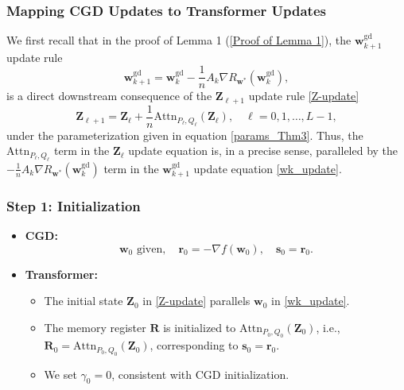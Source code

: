 \documentclass[11pt]{article}
\theoremstyle{plain}
\theoremstyle{definition}
\theoremstyle{remark}
\numberwithin{equation}{section}
\begin{document}
\FloatBarrier

\subsubsection*{Mapping CGD Updates to Transformer Updates}

We first recall that in the proof of Lemma 1 (\ref{Proof of Lemma 1}), the \(\mathbf{w}_{k+1}^{\text{gd}}\) update rule
\begin{equation}
\mathbf{w}_{k+1}^{\text{gd}} = \mathbf{w}_k^{\text{gd}} - \frac{1}{n} A_k \nabla R_{\mathbf{w}^*}(\mathbf{w}_k^{\text{gd}}), \label{wk_update}
\end{equation}
is a direct downstream consequence of the \(\mathbf{Z}_{\ell+1}\) update rule \eqref{Z-update}
\[
\mathbf{Z}_{\ell+1} = \mathbf{Z}_\ell + \frac{1}{n} \mathrm{Attn}_{P_\ell, Q_\ell} (\mathbf{Z}_\ell), \quad \ell = 0, 1, \dots, L-1,
\]
under the parameterization given in equation \eqref{params_Thm3}. Thus, the \(\mathrm{Attn}_{P_\ell, Q_\ell}\) term in the \(\mathbf Z_\ell\) update equation is, in a precise sense, paralleled by the \(-\frac{1}{n} A_k \nabla R_{\mathbf{w}^*}(\mathbf{w}_k^{\text{gd}})\) term in the \(\mathbf{w}_{k+1}^{\text{gd}}\) update equation \eqref{wk_update}.

\subsubsection*{Step 1: Initialization}
\begin{itemize}
    \item \textbf{CGD:}
    \[
    \mathbf{w}_0 \text{ given}, \quad \mathbf{r}_0 = -\nabla f(\mathbf{w}_0), \quad \mathbf{s}_0 = \mathbf{r}_0.
    \]
    \item \textbf{Transformer:}
    \begin{itemize}
        \item The initial state \( \mathbf{Z}_0 \) in \eqref{Z-update} parallels \( \mathbf{w}_0 \) in \eqref{wk_update}.
        \item The memory register \( \mathbf{R} \) is initialized to \(\mathrm{Attn}_{P_0, Q_0}(\mathbf{Z}_0)\), i.e., \( \mathbf{R}_{0} =  \mathrm{Attn}_{P_0, Q_0}(\mathbf{Z}_0)\), corresponding to \( \mathbf{s}_{0} = \mathbf{r}_0 \).
        \item We set \( \gamma_0 = 0 \), consistent with CGD initialization.
    \end{itemize}
\end{itemize}
\end{document}
